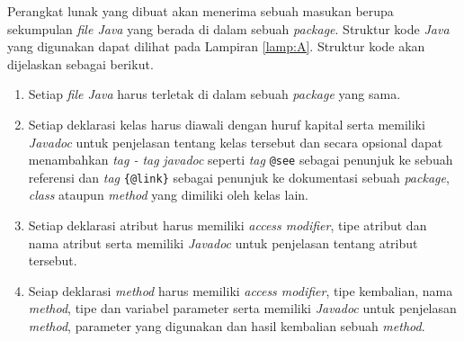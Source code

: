 
Perangkat lunak yang dibuat akan menerima sebuah masukan berupa sekumpulan {\it file Java} yang berada di dalam sebuah {\it package}. Struktur kode {\it Java} yang digunakan dapat dilihat pada Lampiran \ref{lamp:A}. Struktur kode akan dijelaskan sebagai berikut.

\begin{enumerate}
	\item Setiap {\it file Java} harus terletak di dalam sebuah {\it package} yang sama.
	\item Setiap deklarasi kelas harus diawali dengan huruf kapital serta memiliki {\it Javadoc} untuk penjelasan tentang kelas tersebut dan secara opsional dapat menambahkan {\it tag - tag} {\it javadoc} seperti {\it tag} \texttt{@see} sebagai penunjuk ke sebuah referensi dan {\it tag} \texttt{\{@link\}} sebagai penunjuk ke dokumentasi sebuah {\it package}, {\it class} ataupun {\it method} yang dimiliki oleh kelas lain.
	\item Setiap deklarasi atribut harus memiliki {\it access modifier}, tipe atribut dan nama atribut serta memiliki {\it Javadoc} untuk penjelasan tentang atribut tersebut.
	\item Seiap deklarasi {\it method} harus memiliki {\it access modifier}, tipe kembalian, nama {\it method}, tipe dan variabel parameter serta memiliki {\it Javadoc} untuk penjelasan {\it method}, parameter yang digunakan dan hasil kembalian sebuah {\it method}.
\end{enumerate}

